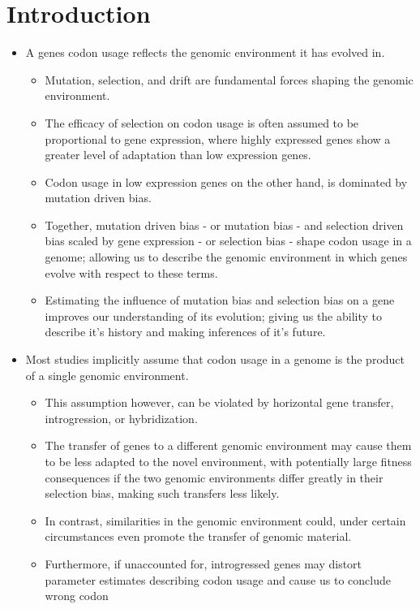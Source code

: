 \documentclass[12pt]{article}
\begin{document}
\section*{Introduction}
\begin{itemize}
	\item A genes codon usage reflects the genomic environment it has evolved in.
	\begin{itemize}
		\item Mutation, selection, and drift are fundamental forces shaping the genomic environment.
		\item The efficacy of selection on codon usage is often assumed to be proportional to gene expression, where highly expressed genes show a greater level of adaptation than low expression genes.
		\item Codon usage in low expression genes on the other hand, is dominated by mutation driven bias. 
		\item Together, mutation driven bias - or mutation bias - and selection driven bias scaled by gene expression - or selection bias - shape codon usage in a genome; allowing us to describe the genomic environment in which genes evolve with respect to these terms.
		\item Estimating the influence of mutation bias and selection bias on a gene improves our understanding of its evolution; giving us the ability to describe it's history and making inferences of it's future.
	\end{itemize}
	\item Most studies implicitly assume that codon usage in a genome is the product of a single genomic environment.
	\begin{itemize}
		\item This assumption however, can be violated by horizontal gene transfer, introgression, or hybridization.
		\item The transfer of genes to a different genomic environment may cause them to be less adapted to the novel environment, with potentially large fitness consequences if the two genomic environments differ greatly in their selection bias, making such transfers less likely.
		\item In contrast, similarities in the genomic environment could, under certain circumstances even promote the transfer of genomic material. 
		\item Furthermore, if unaccounted for, introgressed genes may distort parameter estimates describing codon usage and cause us to conclude wrong codon
	\end{itemize}

\end{itemize}
\end{document}
